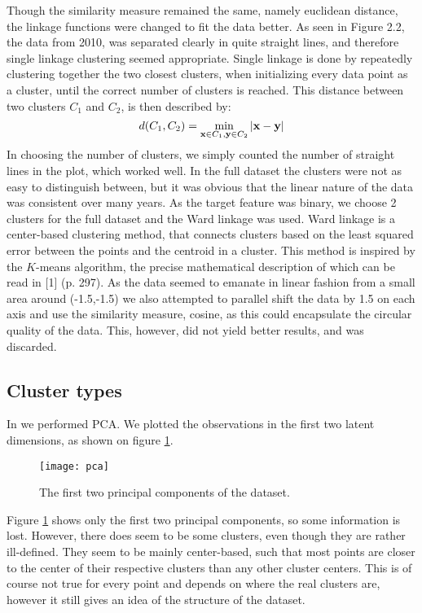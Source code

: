 \noindent
Though the similarity measure remained the same, namely euclidean distance, the linkage functions were changed to fit the data better.
As seen in Figure 2.2, the data from 2010, was separated clearly in quite straight lines, and therefore single linkage clustering seemed appropriate.
Single linkage is done by repeatedly clustering together the two closest clusters, when initializing every data point as a cluster, until the correct number of clusters is reached. This distance between two clusters $C_1$ and $C_2$, is then described by:
\begin{equation}
	d(C_1,C_2) = \underset{\mathbf x \in C_1, \mathbf y \in C_2}{\min} \left\lvert\mathbf x-\mathbf y\right\rvert
\end{equation}
In choosing the number of clusters, we simply counted the number of straight lines in the plot, which worked well.
In the full dataset the clusters were not as easy to distinguish between, but it was obvious that the linear nature of the data was consistent over many years.
As the target feature was binary, we choose 2 clusters for the full dataset and the Ward linkage was used.
Ward linkage is a center-based clustering method, that connects clusters based on the least squared error between the points and the centroid in a cluster. This method is inspired by the $K$-means algorithm, the precise mathematical description of which can be read in [1] (p. 297).
As the data seemed to emanate in linear fashion from a small area around (-1.5,-1.5) we also attempted to parallel shift the data by 1.5 on each axis and use the similarity measure, cosine, as this could encapsulate the circular quality of the data. This, however, did not yield better results, and was discarded.
\subsection{Cluster types}
In \cite{skynet1} we performed PCA.
We plotted the observations in the first two latent dimensions, as shown on figure \ref{fig:PCA}.
\begin{figure}[H]
	\centering
	\texttt{[image: pca]}
	\caption{The first two principal components of the dataset.}\label{fig:PCA}
\end{figure}\noindent
Figure \ref{fig:PCA} shows only the first two principal components, so some information is lost.
However, there does seem to be some clusters, even though they are rather ill-defined.
They seem to be mainly center-based, such that most points are closer to the center of their respective clusters than any other cluster centers.
This is of course not true for every point and depends on where the real clusters are, however it still gives an idea of the structure of the dataset.

